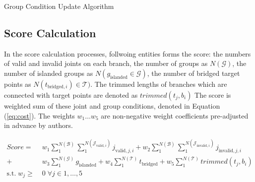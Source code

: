 \begin{algorithm}
  \caption{Group Condition Update Algorithm}
  \begin{algorithmic}[1]
    \EndIf

            \EndIf
            \EndIf
          \EndIf
        \EndFor
      \EndFor

      \EndIf
    \EndFor

  \EndFunction
  \end{algorithmic}
  \label{al:connection}
\end{algorithm}

\subsection{Score Calculation}
In the score calculation processes, follwoing entities forms the score: the numbers of valid and invalid joints on each branch, the number of groups as $N(\mathcal{G} )$, the number of islanded groups as $N(g_{\text{islanded}} \in \mathcal{G} )$, the number of bridged target points as $N(t_{\text{bridged}, i}) \in \mathcal{T} )$.
The trimmed lengths of branches which are connected with target points are denoted as $trimmed(t_j, b_i)$
The score is weighted sum of these joint and group conditions, denoted in Equation (\ref{eq:cost}).
The weights $w_1 \dotso  w_5$ are non-negative weight coefficients pre-adjusted in advance by authors.


\begin{equation} \label{eq:cost}
 \begin{aligned}
 Score =  &\; w_1  \sum_{1}^{N(\mathcal{B})} \sum_{1}^{N(\mathcal{J}_{\text{valid},i})} j_{\text{valid}, j, i}
 + w_2  \sum_{1}^{N(\mathcal{B})} \sum_{1}^{N(\mathcal{J}_{\text{invalid},i})} j_{\text{invalid}, j, i}\\
+ &\; w_3  \sum_{1}^{N(\mathcal{G})} g_{\text{islanded}}
	 + w_4  \sum_{1}^{N(\mathcal{T})} t_{\text{bridged}}
+  w_5 \sum_{1}^{N(\mathcal{T})} trimmed(t_j, b_i)
 \\
   \textrm{s.t.} \; w_j  \geq  &\;0 \; \forall j \in 1, \dotsc , 5
 \end{aligned}
\end{equation}

